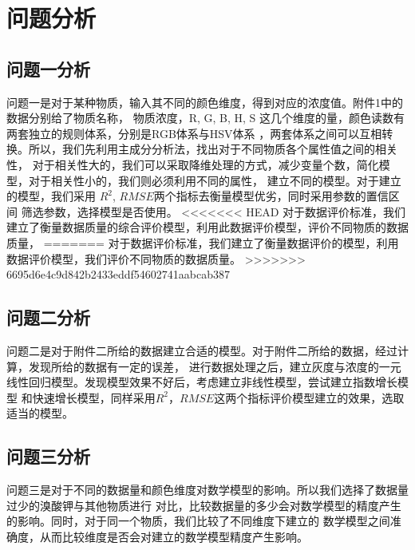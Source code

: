 \section{问题分析}
\subsection{问题一分析}
问题一是对于某种物质，输入其不同的颜色维度，得到对应的浓度值。附件1中的数据分别给了物质名称，
物质浓度，R, G, B, H, S 这几个维度的量，颜色读数有两套独立的规则体系，分别是RGB体系与HSV体系
，两套体系之间可以互相转换。所以，我们先利用主成分分析法，找出对于不同物质各个属性值之间的相关性，
对于相关性大的，我们可以采取降维处理的方式，减少变量个数，简化模型，对于相关性小的，我们则必须利用不同的属性，
建立不同的模型。对于建立的模型，我们采用 $R^2$, $RMSE$两个指标去衡量模型优劣，同时采用参数的置信区间
筛选参数，选择模型是否使用。
<<<<<<< HEAD
对于数据评价标准，我们建立了衡量数据质量的综合评价模型，利用此数据评价模型，评价不同物质的数据质量，
=======
对于数据评价标准，我们建立了衡量数据评价的模型，利用数据评价模型，我们评价不同物质的数据质量。
>>>>>>> 6695d6e4c9d842b2433eddf54602741aabcab387

\subsection{问题二分析}
问题二是对于附件二所给的数据建立合适的模型。对于附件二所给的数据，经过计算，发现所给的数据有一定的误差，
进行数据处理之后，建立灰度与浓度的一元线性回归模型。发现模型效果不好后，考虑建立非线性模型，尝试建立指数增长模型
和快速增长模型，同样采用$R^2$，$RMSE$这两个指标评价模型建立的效果，选取适当的模型。

\subsection{问题三分析}
问题三是对于不同的数据量和颜色维度对数学模型的影响。所以我们选择了数据量过少的溴酸钾与其他物质进行
对比，比较数据量的多少会对数学模型的精度产生的影响。同时，对于同一个物质，我们比较了不同维度下建立的
数学模型之间准确度，从而比较维度是否会对建立的数学模型精度产生影响。
